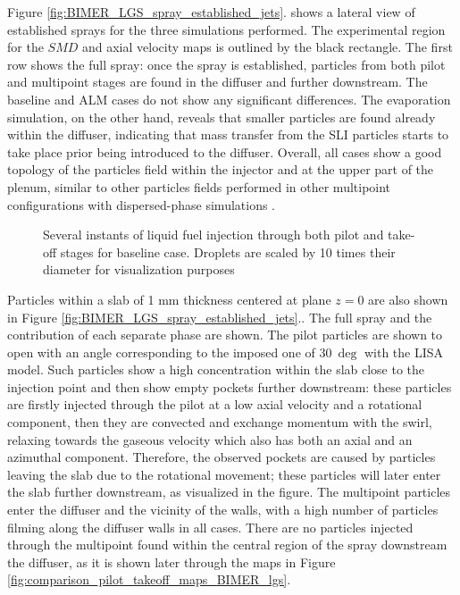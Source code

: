 Figure \ref{fig:BIMER_LGS_spray_established_jets}. shows a lateral view of established sprays for the three simulations performed. The experimental region for the $SMD$ and axial velocity maps is outlined by the black rectangle. The first row shows the full spray: once the spray is established, particles from both pilot and multipoint stages are found in the diffuser and further downstream. The baseline and ALM cases do not show any significant differences. The evaporation simulation, on the other hand, reveals that smaller particles are found already within the diffuser, indicating that mass transfer from the SLI particles starts to take place prior being introduced to the diffuser. Overall, all cases show a good topology of the particles field within the injector and at the upper part of the plenum, similar to other particles fields performed in other multipoint configurations with dispersed-phase simulations . 

\clearpage

\begin{figure}[h!]
	\centering	{}
	\caption[Several instants of liquid fuel injection through both pilot and take-off stages for baseline case]{Several instants of liquid fuel injection through both pilot and take-off stages for baseline case. Droplets are scaled by 10 times their diameter for visualization purposes}	\label{fig:BIMER_LGS_spray_establishment}
\end{figure}




Particles within a slab of 1 mm thickness centered at plane $z = 0$ are also shown in Figure \ref{fig:BIMER_LGS_spray_established_jets}..  The full spray and the contribution of each separate phase are shown. The pilot particles are shown to open with an angle corresponding to the imposed one of $30~\deg$ with the LISA model. Such particles show a high concentration within the slab close to the injection point and then show empty pockets further downstream: these particles are firstly injected through the pilot at a low axial velocity and a rotational component, then they are convected and exchange momentum with the swirl, relaxing towards the gaseous velocity which also has both an axial and an azimuthal component. Therefore, the observed pockets are caused by particles leaving the slab due to the rotational movement; these particles will later enter the slab further downstream, as visualized in the figure. The multipoint particles enter the diffuser and the vicinity of the walls, with a high number of particles filming along the diffuser walls in all cases. There are no particles injected through the multipoint found within the central region of the spray downstream the diffuser, as it is shown later through the maps in Figure \ref{fig:comparison_pilot_takeoff_maps_BIMER_lgs}.


